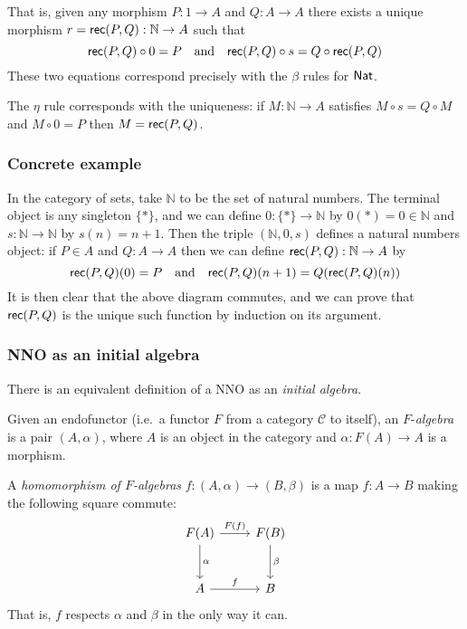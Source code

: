 \documentclass[12pt]{article}
\begin{document}
That is, given any morphism $P : 1 \to A$ and $Q : A \to A$ there exists a unique morphism $r = \mathsf{rec}(P,Q) : \mathbb{N} \to A$ such that
\begin{equation*}
\mathsf{rec}(P,Q) \circ 0 = P \quad \text{and} \quad \mathsf{rec}(P,Q) \circ s = Q \circ \mathsf{rec}(P,Q)
\end{equation*}
These two equations correspond precisely with the $\beta$ rules for $\mathsf{Nat}$.

The $\eta$ rule corresponds with the uniqueness: if $M : \mathbb{N} \to A$ satisfies $M \circ s = Q \circ M$ and $M \circ 0 = P$ then $M = \mathsf{rec}(P,Q)$.

\subsubsection*{Concrete example} In the category of sets, take $\mathbb{N}$ to be the set of natural numbers. The terminal object is any singleton $\{ * \}$, and we can define $0 : \{ * \} \to \mathbb{N}$ by $0(*)=0 \in \mathbb{N}$ and $s : \mathbb{N} \to \mathbb{N}$ by $s(n)=n+1$. Then the triple $(\mathbb{N},0,s)$ defines a natural numbers object: if $P \in A$ and $Q : A \to A$ then we can define $\mathsf{rec}(P,Q) : \mathbb{N} \to A$ by
$$\mathsf{rec}(P,Q)(0) = P \quad \text{and} \quad \mathsf{rec}(P,Q)(n+1)=Q(\mathsf{rec}(P,Q)(n))$$
It is then clear that the above diagram commutes, and we can prove that $\mathsf{rec}(P,Q)$ is the unique such function by induction on its argument.

\subsubsection*{\acs{NNO} as an initial algebra}
There is an equivalent definition of a \acl{NNO} as an \emph{initial algebra}.

Given an endofunctor (i.e.\ a functor $F$ from a category $\mathcal{C}$ to itself), an $F$-\emph{algebra} is a pair $(A, \alpha)$, where $A$ is an object in the category and $\alpha : F(A) \to A$ is a morphism.

A \emph{homomorphism of $F$-algebras} $f : (A, \alpha) \to (B, \beta)$ is a map $f : A \to B$ making the following square commute:
\[
\begin{tikzcd}[column sep=normal,row sep=large]
F(A)\rar{F(f)}\dar{\alpha} & F(B)\dar{\beta}	\\
A\rar{f} & B
\end{tikzcd}
\]
That is, $f$ respects $\alpha$ and $\beta$ in the only way it can.
\end{document}
